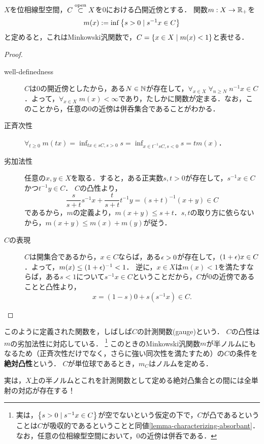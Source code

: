 \documentclass[uplatex,dvipdfmx]{jsreport}
\begin{document}
\begin{lemma}[gauge]
    $X$を位相線型空間，$C\overset{\mathrm{open}}{\subset} X$を$0$における凸開近傍とする．
    関数$m:X\to\mathbb{R}_+$を
    \[m(x):=\inf\left\{s>0\mid s^{-1}x\in C\right\}\]
    と定めると，これはMinkowski汎関数で，$C=\left\{x\in X\mid m(x)<1\right\}$と表せる．
\end{lemma}
\begin{proof}\mbox{}
    \begin{description}
        \item[well-definedness] $C$は$0$の開近傍としたから，ある$N\in\mathbb{N}$が存在して，$\forall_{x\in X}\;\forall_{n\ge N}\;n^{-1}x\in C$．よって，$\forall_{x\in X}\;m(x)<\infty$であり，たしかに関数が定まる．なお，このことから，任意の$0$の近傍は併呑集合であることがわかる．
        \item[正斉次性] $\forall_{t\ge 0}\;m(tx)=\inf_{tx\in sC,s>0}s=\inf_{x\in t^{-1}sC,s<0}s=tm(x)$．
        \item[劣加法性] 任意の$x,y\in X$を取る．すると，ある正実数$s,t>0$が存在して，$s^{-1}x\in C$かつ$t^{-1}y\in C$．
        $C$の凸性より，
        \[\frac{s}{s+t}s^{-1}x+\frac{t}{s+t}t^{-1}y=(s+t)^{-1}(x+y)\in C\]
        であるから，$m$の定義より，$m(x+y)\le s+t$．$s,t$の取り方に依らないから，$m(x+y)\le m(x)+m(y)$が従う．
        \item[$C$の表現] $C$は開集合であるから，$x\in C$ならば，ある$\epsilon>0$が存在して，$(1+\epsilon)x\in C$．よって，$m(x)\le(1+\epsilon)^{-1}<1$．
        逆に，$x\in X$は$m(x)<1$を満たすならば，ある$s<1$について$s^{-1}x\in C$ということだから，$C$が$0$の近傍であることと凸性より，
        \[x=(1-s)0+s(s^{-1}x)\in C.\]
    \end{description}
\end{proof}
\begin{remarks}\label{remarks-seminorm-and-absolutely-convex-sets}
    このように定義された関数を，しばしば$C$の計測関数(gauge)という．
    $C$の凸性は$m$の劣加法性に対応している．
    \footnote{実は，$\left\{s>0\mid s^{-1}x\in C\right\}$が空でないという仮定の下で，$C$が凸であるということは$C$が吸収的であるということと同値\ref{lemma-characterizing-absorbant}．なお，任意の位相線型空間において，$0$の近傍は併呑である．}
    このときのMinkowski汎関数$m$が半ノルムにもなるため（正斉次性だけでなく，さらに強い同次性を満たすため）の$C$の条件を\textbf{絶対凸性}という．
    $C$が単位球であるとき，$m_C$はノルムを定める．

    実は，$X$上の半ノルムとこれを計測関数として定める絶対凸集合との間には全単射の対応が存在する！
\end{remarks}
\end{document}
